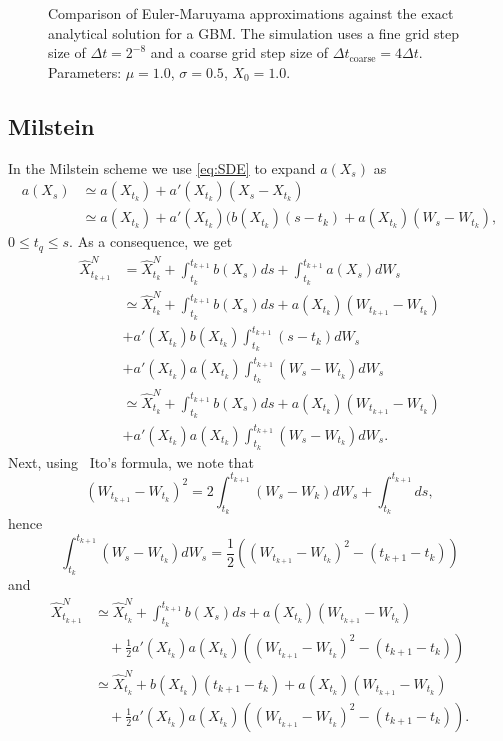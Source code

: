 \begin{figure}[H]
    \centering
    
    \caption{Comparison of Euler-Maruyama approximations against the exact analytical solution for a GBM. The simulation uses a fine grid step size of \(\Delta t = 2^{-8}\) and a coarse grid step size of \(\Delta t_{\text{coarse}} = 4\Delta t\). Parameters: \(\mu=1.0\), \(\sigma=0.5\), \(X_0=1.0\).}
    \label{fig:eulerMaruyamaCoarseFineComparison}
\end{figure}

\clearpage
\subsection{Milstein}
In the Milstein scheme we use \cref{eq:SDE} to expand \(a(X_s)\) as
\begin{align*}
    a(X_s) &\simeq a(X_{t_k}) + a'(X_{t_k}) (X_s - X_{t_k}) \\
    &\simeq a(X_{t_k}) + a'(X_{t_k})(b(X_{t_k}) (s-t_k) + a(X_{t_k}) (W_s - W_{t_k}),
\end{align*}
\(0 \leq t_q \leq s\). As a consequence, we get
\begin{align*}
    \hat{X}_{t_{k+1}}^N &= \hat{X}_{t_k}^N + \int_{t_k}^{t_{k+1}} b(X_s) ds + \int_{t_k}^{t_{k+1}} a(X_s) dW_s \\
    &\simeq \hat{X}_{t_k}^N + \int_{t_k}^{t_{k+1}} b(X_s) ds + a(X_{t_k})(W_{t_{k+1}} - W_{t_k}) \\
    &+ a'(X_{t_k})b(X_{t_k}) \int_{t_k}^{t_{k+1}} (s - t_k) dW_s \\
    &+ a'(X_{t_k})a(X_{t_k}) \int_{t_k}^{t_{k+1}} (W_s - W_{t_k}) dW_s \\
    &\simeq \hat{X}_{t_k}^N + \int_{t_k}^{t_{k+1}} b(X_s) ds + a(X_{t_k})(W_{t_{k+1}} - W_{t_k}) \\
    &+ a'(X_{t_k})a(X_{t_k}) \int_{t_k}^{t_{k+1}} (W_s - W_{t_k}) dW_s.
\end{align*}
Next, using \ Ito's formula, we note that
\begin{equation*}
    (W_{t_{k+1}} - W_{t_k})^2 = 2 \int_{t_k}^{t_{k+1}} (W_s - W_k)dW_s + \int_{t_k}^{t_{k+1}} ds,
\end{equation*}
hence
\begin{equation*}
    \int_{t_k}^{t_{k+1}} (W_s - W_{t_k}) dW_s = \frac{1}{2} ((W_{t_{k+1}}-W_{t_k})^2 - (t_{k+1} - t_k))
\end{equation*}
and
\begin{align*}
    \hat{X}_{t_{k+1}}^N &\simeq \hat{X}_{t_k}^N + \int_{t_k}^{t_{k+1}} b(X_s) ds + a(X_{t_k})(W_{t_{k+1}} - W_{t_k}) \\
    &\quad + \frac{1}{2} a'(X_{t_k})a(X_{t_k})((W_{t_{k+1}} - W_{t_k})^2 - (t_{k+1} - t_k)) \\
    &\simeq \hat{X}_{t_k}^N + b(X_{t_k})(t_{k+1} - t_k) + a(X_{t_k})(W_{t_{k+1}} - W_{t_k}) \\
    &\quad + \frac{1}{2} a'(X_{t_k})a(X_{t_k})((W_{t_{k+1}} - W_{t_k})^2 - (t_{k+1} - t_k)).
\end{align*}
